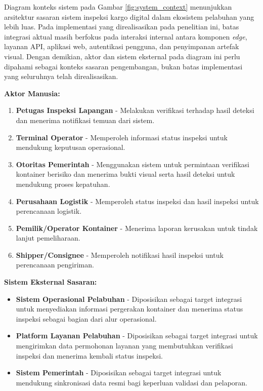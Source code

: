 \FloatBarrier

Diagram konteks sistem pada Gambar \ref{fig:system_context} menunjukkan
arsitektur sasaran sistem inspeksi kargo digital dalam ekosistem pelabuhan yang
lebih luas. Pada implementasi yang direalisasikan pada penelitian ini, batas
integrasi aktual masih berfokus pada interaksi internal antara komponen
\textit{edge}, layanan API, aplikasi web, autentikasi pengguna, dan
penyimpanan artefak visual. Dengan demikian, aktor dan sistem eksternal pada
diagram ini perlu dipahami sebagai konteks sasaran pengembangan, bukan batas
implementasi yang seluruhnya telah direalisasikan.

\textbf{Aktor Manusia:}
\begin{enumerate}
  \item \textbf{Petugas Inspeksi Lapangan} - Melakukan verifikasi terhadap hasil deteksi dan menerima notifikasi temuan dari sistem.

  \item \textbf{Terminal Operator} - Memperoleh informasi status inspeksi untuk mendukung keputusan operasional.

  \item \textbf{Otoritas Pemerintah} - Menggunakan sistem untuk permintaan verifikasi kontainer berisiko dan menerima bukti visual serta hasil deteksi untuk mendukung proses kepatuhan.

  \item \textbf{Perusahaan Logistik} - Memperoleh status inspeksi dan hasil inspeksi untuk perencanaan logistik.

  \item \textbf{Pemilik/Operator Kontainer} - Menerima laporan kerusakan untuk tindak lanjut pemeliharaan.

  \item \textbf{Shipper/Consignee} - Memperoleh notifikasi hasil inspeksi untuk perencanaan pengiriman.
\end{enumerate}

\textbf{Sistem Eksternal Sasaran:}
\begin{itemize}
  \item \textbf{Sistem Operasional Pelabuhan} - Diposisikan sebagai target integrasi untuk menyediakan informasi pergerakan kontainer dan menerima status inspeksi sebagai bagian dari alur operasional.

  \item \textbf{Platform Layanan Pelabuhan} - Diposisikan sebagai target integrasi untuk mengirimkan data permohonan layanan yang membutuhkan verifikasi inspeksi dan menerima kembali status inspeksi.

  \item \textbf{Sistem Pemerintah} - Diposisikan sebagai target integrasi untuk mendukung sinkronisasi data resmi bagi keperluan validasi dan pelaporan.
\end{itemize}

